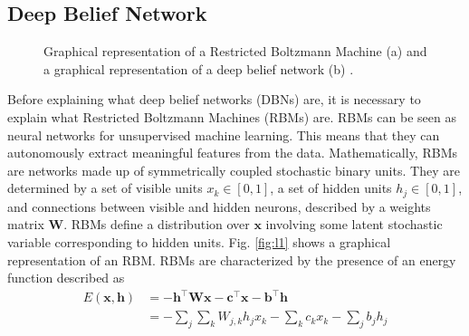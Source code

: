 \subsection{Deep Belief Network}
\label{subsec:dbn}

\begin{figure}
    \centering
    \qquad
    \caption[RBM structure.]{Graphical representation of a Restricted Boltzmann Machine (a) and a graphical representation of a deep belief network (b) \cite{hugo_larochelle_neural_2013}.}
\end{figure}
Before explaining what deep belief networks (DBNs) are, it is necessary to explain what Restricted Boltzmann Machines (RBMs) are. RBMs can be seen as neural networks for unsupervised machine learning. This means that they can autonomously extract meaningful features from the data. Mathematically, RBMs are networks made up of symmetrically coupled stochastic binary units. They are determined by a set of visible units $x_k\in[0,1]$, a set of hidden units $h_j\in[0,1]$, and connections between visible and hidden neurons, described by a weights matrix $\mathbf{W}$. RBMs define a distribution over $\mathbf{x}$ involving some latent stochastic variable corresponding to hidden units. Fig. \ref{fig:l1} shows a graphical representation of an RBM. RBMs are characterized by the presence of an energy function described as
\begin{equation}
\begin{aligned}
E(\mathbf{x}, \mathbf{h}) & =-\mathbf{h}^{\top} \mathbf{W} \mathbf{x}-\mathbf{c}^{\top} \mathbf{x}-\mathbf{b}^{\top} \mathbf{h} \\
& =-\sum_j \sum_k W_{j, k} h_j x_k-\sum_k c_k x_k-\sum_j b_j h_j
\end{aligned}
\end{equation}
